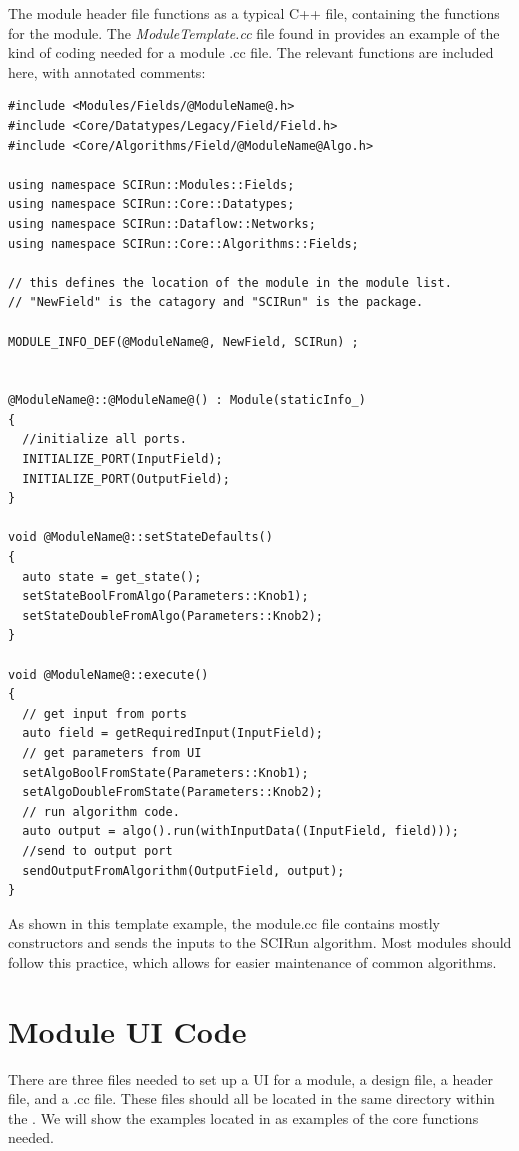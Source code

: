 \documentclass[fleqn,11pt,openany]{book}
\begin{document}
The module header file functions as a typical C++ file, containing the functions for the module.  
The \emph{ModuleTemplate.cc} file found in \emph{} provides an example of the kind of coding needed for a module .cc file.  
The relevant functions are included here, with annotated comments:
\begin{verbatim}
#include <Modules/Fields/@ModuleName@.h>
#include <Core/Datatypes/Legacy/Field/Field.h>
#include <Core/Algorithms/Field/@ModuleName@Algo.h>

using namespace SCIRun::Modules::Fields;
using namespace SCIRun::Core::Datatypes;
using namespace SCIRun::Dataflow::Networks;
using namespace SCIRun::Core::Algorithms::Fields;

// this defines the location of the module in the module list.  
// "NewField" is the catagory and "SCIRun" is the package.

MODULE_INFO_DEF(@ModuleName@, NewField, SCIRun) ;


@ModuleName@::@ModuleName@() : Module(staticInfo_)
{
  //initialize all ports.
  INITIALIZE_PORT(InputField);
  INITIALIZE_PORT(OutputField);
}

void @ModuleName@::setStateDefaults()
{
  auto state = get_state();
  setStateBoolFromAlgo(Parameters::Knob1);
  setStateDoubleFromAlgo(Parameters::Knob2);
}

void @ModuleName@::execute()
{
  // get input from ports
  auto field = getRequiredInput(InputField);
  // get parameters from UI
  setAlgoBoolFromState(Parameters::Knob1);
  setAlgoDoubleFromState(Parameters::Knob2);
  // run algorithm code.  
  auto output = algo().run(withInputData((InputField, field)));
  //send to output port
  sendOutputFromAlgorithm(OutputField, output);
}
\end{verbatim}

As shown in this template example, the module.cc file contains mostly constructors and sends the inputs to the SCIRun algorithm.
Most modules should follow this practice, which allows for easier maintenance of common algorithms.   


\section{Module UI Code}
\label{sec:ui}

There are three files needed to set up a UI for a module, a design file, a header file, and a .cc file.  
These files should all be located in the same directory within the \emph{}. 
We will show the examples located in \emph{} as examples of the core functions needed.
\end{document}
